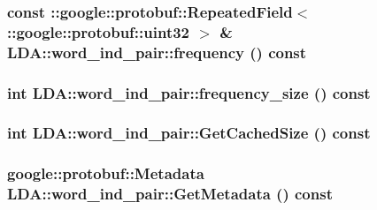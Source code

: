 \label{class_l_d_a_1_1word__ind__pair_a6c44dbd24bf839caf7d8bdcc6a665437}
\hypertarget{class_l_d_a_1_1word__ind__pair_a3559975ed278b3c1c1e85c4c87ed9881}{
\subsubsection[{frequency}]{\setlength{\rightskip}{0pt plus 5cm}const ::google::protobuf::RepeatedField$<$::google::protobuf::uint32 $>$ \& LDA::word\_\-ind\_\-pair::frequency () const}}
\label{class_l_d_a_1_1word__ind__pair_a3559975ed278b3c1c1e85c4c87ed9881}
\hypertarget{class_l_d_a_1_1word__ind__pair_a5a8f75c1af5c6a74b8ff473c4e64902d}{
\subsubsection[{frequency\_\-size}]{\setlength{\rightskip}{0pt plus 5cm}int LDA::word\_\-ind\_\-pair::frequency\_\-size () const}}
\label{class_l_d_a_1_1word__ind__pair_a5a8f75c1af5c6a74b8ff473c4e64902d}
\hypertarget{class_l_d_a_1_1word__ind__pair_a922d986b141e9fe7974241c6914213bb}{
\subsubsection[{GetCachedSize}]{\setlength{\rightskip}{0pt plus 5cm}int LDA::word\_\-ind\_\-pair::GetCachedSize () const}}
\label{class_l_d_a_1_1word__ind__pair_a922d986b141e9fe7974241c6914213bb}
\hypertarget{class_l_d_a_1_1word__ind__pair_a961e6d93c3a647d4ca58cfdca7fe012c}{
\subsubsection[{GetMetadata}]{\setlength{\rightskip}{0pt plus 5cm}google::protobuf::Metadata LDA::word\_\-ind\_\-pair::GetMetadata () const}}
